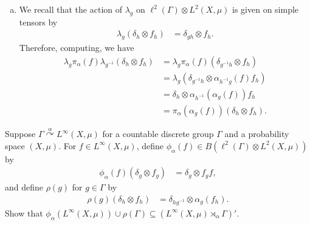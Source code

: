 \documentclass[10pt]{mypackage}
\begin{document}
\begin{solution}
\begin{enumerate}[(a)]
      Next, observe that
      \begin{align*}
        \pi_{\alpha}(fh)\left( \delta_g\otimes f_g \right) &= \delta_g \otimes \alpha_{g^{-1}}\left( fh \right)f_g\\
                                                           &= \delta_g\otimes \alpha_{g^{-1}}\left( hf \right)
      \end{align*}
    \item We recall that the action of $\lambda_g$ on $\ell^2\left( \Gamma \right)\otimes L^2\left( X,\mu \right)$ is given on simple tensors by
      \begin{align*}
        \lambda_g\left( \delta_h\otimes f_h \right) &= \delta_{gh} \otimes f_h.
      \end{align*}
      Therefore, computing, we have
      \begin{align*}
        \lambda_g\pi_{\alpha}(f)\lambda_{g^{-1}}\left( \delta_h\otimes f_h \right) &= \lambda_g\pi_{\alpha}(f)\left( \delta_{g^{-1}h}\otimes f_h \right)\\
                                                                                   &= \lambda_g\left( \delta_{g^{-1}h}\otimes \alpha_{h^{-1}g}(f)f_h \right)\\
                                                                                   &= \delta_h\otimes \alpha_{h^{-1}}\left( \alpha_g(f) \right)f_h\\
                                                                                   &= \pi_{\alpha}\left( \alpha_g(f) \right)\left( \delta_h\otimes f_h \right).
      \end{align*}
  \end{enumerate}
\end{solution}
\begin{problem}[Problem 2]
  Suppose $\Gamma\overset{\alpha}{\curvearrowright}L^{\infty}\left( X,\mu \right)$ for a countable discrete group $\Gamma$ and a probability space $\left( X,\mu \right)$. For $f\in L^{\infty}\left( X,\mu \right)$, define $\phi_{\alpha}(f)\in B\left( \ell^2\left( \Gamma \right)\otimes L^2\left( X,\mu \right) \right)$ by
  \begin{align*}
    \phi_{\alpha}(f)\left( \delta_g\otimes f_g \right) &= \delta_g\otimes f_g f,
  \end{align*}
  and define $\rho(g)$ for $g\in \Gamma$ by
  \begin{align*}
    \rho(g)\left( \delta_h\otimes f_h \right) &= \delta_{hg^{-1}}\otimes \alpha_g\left( f_h \right).
  \end{align*}
  Show that $\phi_{\alpha}\left( L^{\infty}\left( X,\mu \right) \right)\cup \rho\left( \Gamma \right)\subseteq \left( L^{\infty}\left( X,\mu \right)\rtimes_{\alpha} \Gamma \right)'$.
\end{problem}
\end{document}
